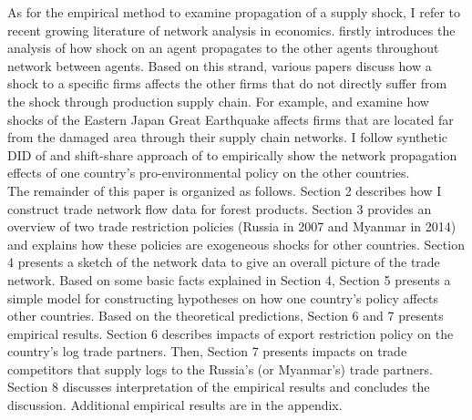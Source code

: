 \documentclass[a4paper,12pt]{article}
\begin{document}
As for the empirical method to examine propagation of a supply shock, I refer to recent growing literature of network analysis in economics. \cite{acemoglu2012network} firstly introduces the analysis of how shock on an agent propagates to the other agents throughout network between agents. Based on this strand, various papers discuss how a shock to a specific firms affects the other firms that do not directly suffer from the shock through production supply chain. For example, \cite{barrot2016input} and \cite{carvalho2021supply} examine how shocks of the Eastern Japan Great Earthquake affects firms that are located far from the damaged area through their supply chain networks. I follow synthetic DID of \cite{xu2017generalized} and shift-share approach of \cite{huneeus2018production} to empirically show the network propagation effects of one country's pro-environmental policy on the other countries.\\

The remainder of this paper is organized as follows. Section 2 describes how I construct trade network flow data for forest products. Section 3 provides an overview of two trade restriction policies (Russia in 2007 and Myanmar in 2014) and explains how these policies are exogeneous shocks for other countries. Section 4 presents a sketch of the network data to give an overall picture of the trade network. Based on some basic facts explained in Section 4, Section 5 presents a simple model for constructing hypotheses on how one country's policy affects other countries. Based on the theoretical predictions, Section 6 and 7 presents empirical results. Section 6 describes impacts of export restriction policy on the country's log trade partners. Then, Section 7 presents impacts on trade competitors that supply logs to the Russia's (or Myanmar's) trade partners. Section 8 discusses interpretation of the empirical results and concludes the discussion. Additional empirical results are in the appendix.\\
\end{document}

